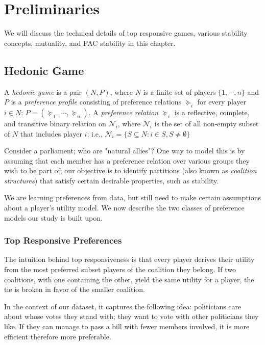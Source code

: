 
\chapter{Preliminaries}
\label{ch:preliminaries}
\vspace{2em}

We will discuss the technical details of top responsive games,
various stability concepts, mutuality, and PAC stability in this chapter.

\section{Hedonic Game}
\label{sec:hedonic_game}
A \textit{hedonic game} is a pair $(N, P)$, where $N$ is a finite set of players
$\{1, \cdots, n\}$ and $P$ is a \textit{preference profile} consisting of
preference relations $\succeq_i$ for every player $i \in N$:
$P = (\succeq_1, \cdots, \succeq_n)$.
A \textit{preference relation} $\succeq_i$ is a reflective, complete, and
transitive binary relation on $\mathcal{N}_i$, where $\mathcal{N}_i$ is the set
of all non-empty subset of $N$ that includes player $i$;
i.e., $\mathcal{N}_i = \{S \subseteq N: i \in S, S \neq \emptyset \}$

Consider a parliament; who are "natural allies"? One way to model this is by
assuming that each member has a preference relation over various groups they
wish to be part of; our objective is to identify partitions
(also known as \textit{coalition structures}) that satisfy certain desirable
properties, such as stability.

We are learning preferences from data, but still need to make certain
assumptions about a player's utility model.
We now describe the two classes of preference models our study is built upon.

\subsection{Top Responsive Preferences}
\label{subsec:top_responsive_preferences}
The intuition behind top responsiveness is that every player derives their
utility from the most preferred subset players of the coalition they belong.
If two coalitions, with one containing the other, yield the same utility for
a player, the tie is broken in favor of the smaller coalition.

In the context of our dataset, it captures the following idea:
politicians care about whose votes they stand with;
they want to vote with other politicians they like.
If they can manage to pass a bill with fewer members involved,
it is more efficient therefore more preferable.

